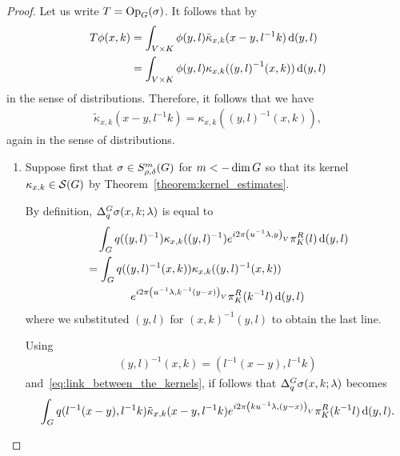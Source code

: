 \begin{proof}
    Let us write $T = \mathrm{Op}_{G} (\sigma)$.
    It follows that by
    \begin{align*}
        T \phi(x, k)
        &= \int_{V \times K} \phi(y, l) {\tilde \kappa}_{x, k}(x - y, l^{-1} k) \,\mathrm{d} (y, l)\\
        &= \int_{V \times K} \phi(y, l) {\kappa}_{x, k}({(y, l)}^{-1} (x, k)) \,\mathrm{d} (y, l)
    \end{align*}
    in the sense of distributions.
    Therefore, it follows that we have
    \begin{align}
        {\tilde \kappa}_{x, k}(x - y, l^{-1} k) =
        {\kappa}_{x, k}({(y, l)}^{-1} (x, k)),
        \label{eq:link_between_the_kernels}
    \end{align}
    again in the sense of distributions.

    \begin{enumerate}
        \item
            Suppose first that $\sigma \in S^{m}_{\rho, \delta}(G)$ for $m < -\dim G$
            so that its kernel $\kappa_{x, k} \in {\mathcal{S} (G)}$ by Theorem~\ref{theorem:kernel_estimates}.

            By definition, ${\Delta^{G}_{q}} \sigma(x, k; \lambda)$ is equal to
            \begin{align*}
                &\quad \int_G q((y, l)^{-1}) \kappa_{x, k}((y, l)^{-1}) e^{i 2 \pi {\left(u^{-1} \lambda, y\right)_{V}}} \pi^R_{K}(l) \,\mathrm{d} (y, l)\\
                &= \int_G q((y, l)^{-1} (x, k)) \kappa_{x, k}((y, l)^{-1} (x, k))\\
                &\qquad \qquad e^{i 2 \pi {\left(u^{-1} \lambda, k^{-1} (y - x)\right)_{V}}} \pi^R_{K}(k^{-1} l) \,\mathrm{d} (y, l)
            \end{align*}
            where we substituted $(y, l)$ for $(x, k)^{-1} (y, l)$ to obtain the last line.

            Using
            \begin{align*}
                (y, l)^{-1} (x, k) = (l^{-1}(x - y), l^{-1} k)
            \end{align*}
            and~\eqref{eq:link_between_the_kernels},
            if follows that ${\Delta^{G}_{q}} \sigma(x, k; \lambda)$ becomes
            \begin{align*}
                \int_G q(l^{-1}(x - y), l^{-1} k) \tilde \kappa_{x, k}(x - y, l^{-1} k) e^{i 2 \pi {\left(k u^{-1} \lambda, (y - x)\right)_{V}}} \pi^R_{K}(k^{-1} l) \,\mathrm{d} (y, l).
            \end{align*}


\end{enumerate}
\end{proof}
